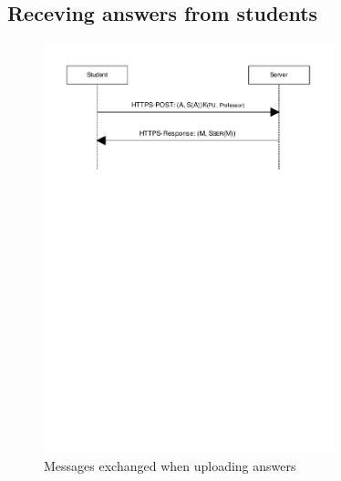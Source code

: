 \documentclass{article}
\begin{document}
\subsection{Receving answers from students}
\label{subsec:impl-answers}

\begin{figure}
  \begin{center}
  \includegraphics[width=0.75\textwidth]{images/upload_answers.pdf}
  \caption{Messages exchanged when uploading answers}
  \label{fig:upload-answers}
  \end{center}
\end{figure}
\end{document}

